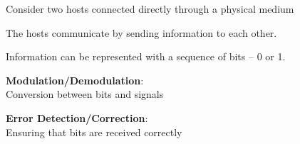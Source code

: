 \begin{frame}[plain]\begin{center}
\end{center}\end{frame}

\begin{frame}[t]\normalsize
	Consider two hosts connected directly through a physical medium
\end{frame}

\begin{frame}[t]\normalsize
	The hosts communicate by sending information to each other.
\end{frame}

\begin{frame}[t]\normalsize
	Information can be represented with a sequence of bits -- 0 or 1.
\end{frame}

\begin{frame} \begin{center} \large
	\textbf{Modulation/Demodulation}:\\ Conversion between bits and signals\\
\end{center} \end{frame}

\begin{frame} \begin{center} \large
	\textbf{Error Detection/Correction}:\\ Ensuring that bits are received correctly\\
\end{center} \end{frame}

